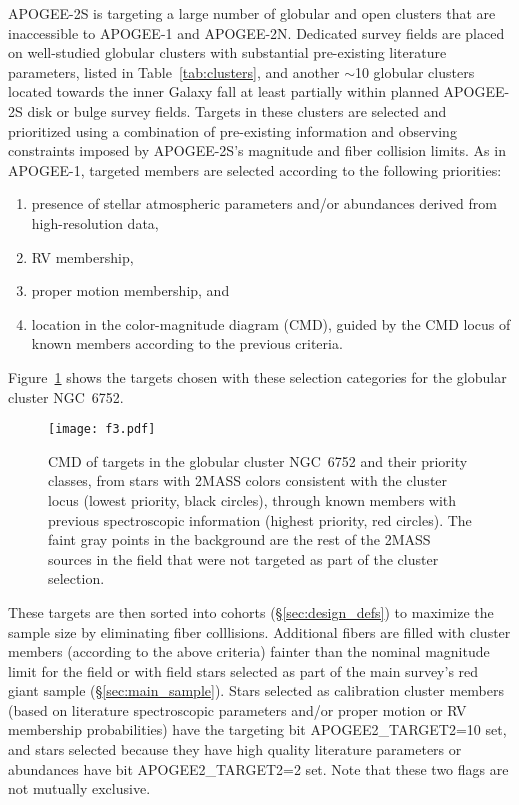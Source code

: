 \documentclass[12pt,twocolumn]{emulateapj}
\begin{document}
APOGEE-2S is targeting a large number of globular and open clusters that are inaccessible to APOGEE-1 and APOGEE-2N.  Dedicated survey fields are placed on well-studied globular clusters with substantial pre-existing literature parameters, listed in Table~\ref{tab:clusters}, and 
another $\sim$10 globular clusters located towards the inner Galaxy fall at least partially within planned APOGEE-2S disk or bulge survey fields.   Targets in these clusters are selected and prioritized using a combination of %
pre-existing information and observing constraints imposed by APOGEE-2S's magnitude and fiber collision limits.  As in APOGEE-1, targeted members are selected according to the following priorities:
\begin{enumerate} \itemsep -2pt
\item presence of stellar atmospheric parameters and/or abundances derived from high-resolution data,
\item RV membership,
\item proper motion membership, and
\item location in the color-magnitude diagram (CMD), guided by the CMD locus of known members according to the previous criteria.
\end{enumerate}
Figure~\ref{fig:globclustercmd} shows the targets chosen with these selection categories for the globular cluster NGC~6752.

\begin{figure}[!hptb]
\begin{center}
\texttt{[image: f3.pdf]} %
\caption{
CMD of targets in the globular cluster NGC~6752 and their priority classes, from stars with 2MASS colors consistent with the cluster locus (lowest priority, black circles), through known members with previous spectroscopic information (highest priority, red circles).  The faint gray points in the background are the rest of the 2MASS sources in the field that were not targeted as part of the cluster selection.
}
\label{fig:globclustercmd}
\end{center}
\end{figure}

These targets are then sorted into cohorts (\S\ref{sec:design_defs}) to maximize the sample size by eliminating fiber colllisions.  Additional fibers are filled with cluster members (according to the above criteria) fainter than the nominal magnitude limit for the field or with field stars selected as part of the main survey's red giant sample (\S\ref{sec:main_sample}).  Stars selected as calibration cluster members (based on literature spectroscopic parameters and/or proper motion or RV membership probabilities) have the targeting bit APOGEE2\_TARGET2=10 set, and stars selected because they have high quality literature parameters or abundances have bit APOGEE2\_TARGET2=2 set. Note that these two flags are not mutually exclusive.  
\end{document}
